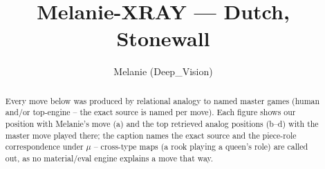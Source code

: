 \documentclass[11pt]{article}
\title{Melanie-XRAY — Dutch, Stonewall}
\author{Melanie (Deep\_Vision)}
\date{}
\begin{document}
\maketitle

\begin{abstract}Every move below was produced by relational analogy to named master games (human and/or top-engine -- the exact source is named per move). Each figure shows our position with Melanie's move (a) and the top retrieved analog positions (b--d) with the master move played there; the caption names the exact source and the piece-role correspondence under $\mu$ -- cross-type maps (a rook playing a queen's role) are called out, as no material/eval engine explains a move that way.\end{abstract}

\begin{figure}[p]\centering
\begin{subfigure}{0.46\textwidth}\centering
\resizebox{\linewidth}{!}{%
\newchessgame
\chessboard[
  setfen={rnbqk2r/pp4pp/2pbpn2/3p1p2/2PP4/5NP1/PP2PPBP/RNBQ1RK1 w kq - 0 7},
  showmover=false,
  pgfstyle=straightmove, color=movearrow, markmove={c4-d5}
]}
\caption{}
\end{subfigure}\hfill
\begin{subfigure}{0.46\textwidth}\centering
\resizebox{\linewidth}{!}{%
\newchessgame
\chessboard[
  setfen={rnbq1rk1/pp2ppbp/3p1np1/2p5/3PP3/2P2N1P/PPB2PP1/RNBQK2R b KQ - 0 7},
  showmover=false,
  pgfstyle=straightmove, color=movearrow, markmove={c5-d4}
]}
\caption{}
\end{subfigure}
\\[4pt]
\begin{subfigure}{0.46\textwidth}\centering
\resizebox{\linewidth}{!}{%
\newchessgame
\chessboard[
  setfen={rnbq1rk1/pp2ppbp/3p1np1/2p5/3PP3/2P2N1P/PPB2PP1/RNBQK2R b KQ - 0 7},
  showmover=false,
  pgfstyle=straightmove, color=movearrow, markmove={c5-d4}
]}
\caption{}
\end{subfigure}\hfill
\begin{subfigure}{0.46\textwidth}\centering
\resizebox{\linewidth}{!}{%
\newchessgame
\chessboard[
  setfen={rnbq1rk1/pp2ppbp/3p1np1/2p5/3PP3/2P2N1P/PPB2PP1/RNBQK2R b KQ - 0 7},
  showmover=false,
  pgfstyle=straightmove, color=movearrow, markmove={c5-d4}
]}
\caption{}
\end{subfigure}

\end{figure}
\end{document}
